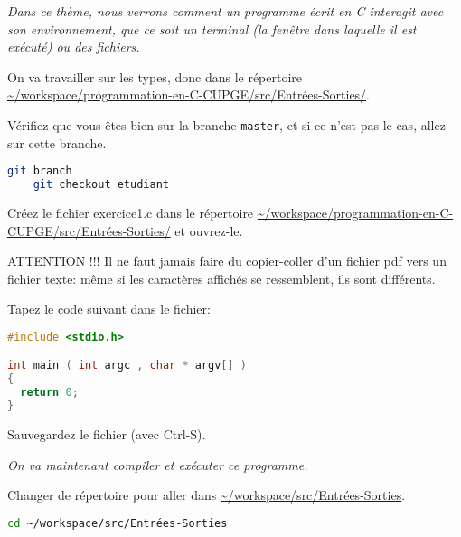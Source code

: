 \titre{\tio}


\begin{center}
  \parbox{0.9\textwidth}{%
    \sl Dans ce thème, nous verrons comment un programme écrit en C
    interagit avec son environnement, que ce soit un terminal (la
    fenêtre dans laquelle il est exécuté) ou des fichiers.
  }
\end{center}

On va travailler sur les types, donc dans le répertoire \url{~/workspace/programmation-en-C-CUPGE/src/Entrées-Sorties/}.

\question Vérifiez que vous êtes bien sur la branche
\texttt{master}, et si ce n'est pas le cas, allez sur cette branche.

\begin{solutioncachee}
  \begin{lstlisting}[language=bash]
    git branch
    git checkout etudiant
  \end{lstlisting}
\end{solutioncachee}

\question Créez le fichier exercice1.c dans le répertoire \expandafter\url{~/workspace/programmation-en-C-CUPGE/src/Entrées-Sorties/} et
ouvrez-le.

\begin{fminipage}{\textwidth}
  ATTENTION !!! Il ne faut jamais faire du copier-coller d'un fichier pdf vers un
  fichier texte: même si les caractères affichés se ressemblent, ils
  sont différents.
\end{fminipage}


\question Tapez le code suivant dans le fichier:
\begin{lstlisting}[language=C]
#include <stdio.h>

int main ( int argc , char * argv[] )
{
  return 0;
}
\end{lstlisting}

\question Sauvegardez le fichier (avec Ctrl-S). 

\begin{center}
  \sl On va maintenant compiler et exécuter ce programme.
\end{center}

\question Changer de répertoire pour aller dans \url{~/workspace/src/Entrées-Sorties}.
\begin{solutioncachee}
  \begin{lstlisting}[language=bash]
    cd ~/workspace/src/Entrées-Sorties
  \end{lstlisting}
\end{solutioncachee}

